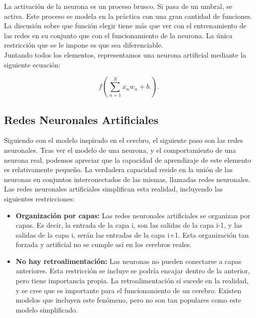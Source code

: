 La activación de la neurona es un proceso brusco. Si pasa de un umbral, se activa. Este proceso se modela en la práctica con una gran cantidad de funciones. La discusión sobre que función elegir tiene más que ver con el entrenamiento de las redes en su conjunto que con el funcionamiento de la neurona. La única restricción que se le impone es que sea diferenciable.\\

Juntando todos los elementos, representamos una neurona artificial mediante la siguiente ecuación:

$$f\left( \sum^N_{n=1} x_n w_n + b. \right).$$

\subsection{Redes Neuronales Artificiales}

Siguiendo con el modelo inspirado en el cerebro, el siguiente paso son las redes neuronales. Tras ver el modelo de una neurona, y el comportamiento de una neurona real, podemos apreciar que la capacidad de aprendizaje de este elemento es relativamente pequeño. La verdadera capacidad reside en la unión de las neuronas en conjuntos interconectados de las mismas, llamadas redes neuronales.\\
 
Las redes neuronales artificiales simplifican esta realidad, incluyendo las siguientes restricciones:
\begin{itemize}
\item \textbf{Organización por capas:} Las redes neuronales artificiales se organizan por capas. Es decir, la entrada de la capa i, son las salidas de la capa i-1, y las salidas de la capa i, serán las entradas de la capa i+1. Esta organización tan forzada y artificial no se cumple así en los cerebros reales. 
\item \textbf{No hay retroalimentación:} Las neuronas no pueden conectarse a capas anteriores. Esta restricción se incluye se podría encajar dentro de la anterior, pero tiene importancia propia. La retroalimentación sí sucede en la realidad, y se cree que es importante para el funcionamiento de un cerebro. Existen modelos que incluyen este fenómeno, pero no son tan populares como este modelo simplificado. 
\end{itemize}

